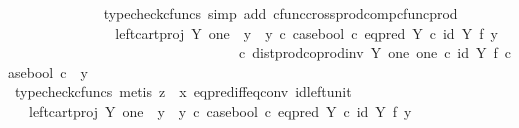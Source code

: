 \begin{isabellebody}
\ \ \ \ \ \ \ \ \ \ \ \ \isamarkupfalse%
\ {\isacharparenleft}{\kern0pt}typecheck{\isacharunderscore}{\kern0pt}cfuncs{\isacharcomma}{\kern0pt}\ simp\ add{\isacharcolon}{\kern0pt}\ cfunc{\isacharunderscore}{\kern0pt}cross{\isacharunderscore}{\kern0pt}prod{\isacharunderscore}{\kern0pt}comp{\isacharunderscore}{\kern0pt}cfunc{\isacharunderscore}{\kern0pt}prod{\isacharparenright}{\kern0pt}\isanewline
\ \ \ \ \ \ \ \ \ \ \isamarkupfalse%
\ \isamarkupfalse%
\ {\isachardoublequoteopen}{\isachardot}{\kern0pt}{\isachardot}{\kern0pt}{\isachardot}{\kern0pt}\ {\isacharequal}{\kern0pt}\ {\isacharparenleft}{\kern0pt}left{\isacharunderscore}{\kern0pt}cart{\isacharunderscore}{\kern0pt}proj\ Y\ one\ {\isasymamalg}\ {\isacharparenleft}{\kern0pt}{\isacharparenleft}{\kern0pt}y{}\ {\isasymamalg}\ y{}{\isacharparenright}{\kern0pt}\ {\isasymcirc}\isactrlsub c\ case{\isacharunderscore}{\kern0pt}bool\ {\isasymcirc}\isactrlsub c\ eq{\isacharunderscore}{\kern0pt}pred\ Y\ {\isasymcirc}\isactrlsub c\ {\isacharparenleft}{\kern0pt}id\ Y\ {\isasymtimes}\isactrlsub f\ y{}{\isacharparenright}{\kern0pt}{\isacharparenright}{\kern0pt}{\isacharparenright}{\kern0pt}\ \isanewline
\ \ \ \ \ \ \ \ \ \ \ \ \ \ \ \ \ \ \ \ \ \ \ \ \ \ \ \ \ \ \ \ \ {\isasymcirc}\isactrlsub c\ dist{\isacharunderscore}{\kern0pt}prod{\isacharunderscore}{\kern0pt}coprod{\isacharunderscore}{\kern0pt}inv\ Y\ one\ one\ {\isasymcirc}\isactrlsub c\ {\isacharparenleft}{\kern0pt}id\ Y\ {\isasymtimes}\isactrlsub f\ case{\isacharunderscore}{\kern0pt}bool{\isacharparenright}{\kern0pt}\ {\isasymcirc}\isactrlsub c\ \ {\isasymlangle}y{\isacharcomma}{\kern0pt}\ {\isasymf}{\isasymrangle}{\isachardoublequoteclose}\isanewline
\ \ \ \ \ \ \ \ \ \ \ \ \isamarkupfalse%
\ {\isacharparenleft}{\kern0pt}typecheck{\isacharunderscore}{\kern0pt}cfuncs{\isacharcomma}{\kern0pt}\ metis\ {\isacartoucheopen}z\ {\isasymnoteq}\ x{\isacartoucheclose}\ eq{\isacharunderscore}{\kern0pt}pred{\isacharunderscore}{\kern0pt}iff{\isacharunderscore}{\kern0pt}eq{\isacharunderscore}{\kern0pt}conv\ id{\isacharunderscore}{\kern0pt}left{\isacharunderscore}{\kern0pt}unit{}{\isacharparenright}{\kern0pt}\isanewline
\ \ \ \ \ \ \ \ \ \ \isamarkupfalse%
\ \isamarkupfalse%
\ {\isachardoublequoteopen}{\isachardot}{\kern0pt}{\isachardot}{\kern0pt}{\isachardot}{\kern0pt}\ {\isacharequal}{\kern0pt}\ {\isacharparenleft}{\kern0pt}left{\isacharunderscore}{\kern0pt}cart{\isacharunderscore}{\kern0pt}proj\ Y\ one\ {\isasymamalg}\ {\isacharparenleft}{\kern0pt}{\isacharparenleft}{\kern0pt}y{}\ {\isasymamalg}\ y{}{\isacharparenright}{\kern0pt}\ {\isasymcirc}\isactrlsub c\ case{\isacharunderscore}{\kern0pt}bool\ {\isasymcirc}\isactrlsub c\ eq{\isacharunderscore}{\kern0pt}pred\ Y\ {\isasymcirc}\isactrlsub c\ {\isacharparenleft}{\kern0pt}id\ Y\ {\isasymtimes}\isactrlsub f\ y{}{\isacharparenright}{\kern0pt}{\isacharparenright}{\kern0pt}{\isacharparenright}{\kern0pt}\ \isanewline

\end{isabellebody}
